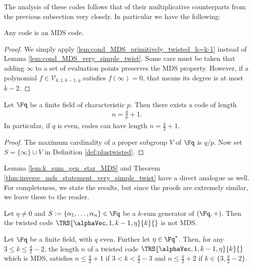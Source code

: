 \documentclass[conference,a4paper]{IEEEtran}
\begin{document}
The analysis of these codes follows that of their multiplicative counterparts from the previous subsection very closely.
In particular we have the following:
\begin{theorem}\label{thm:MDS_property_primitively_twisted_h=k-1}
Any \plustw code is an MDS code.
\end{theorem}
\begin{proof}
We simply apply \cref{lem:cond_MDS_primitively_twisted_h=k-1} instead of Lemma \ref{lem:cond_MDS_very_simple_twist}. Some care must be taken that adding $\infty$ to a set of evaluation points preserves the MDS property. However, if a polynomial $f \in \mathcal{V}_{k,1,k-1,\eta}$ satisfies $f(\infty)=0$, that means its degree is at most $k-2$.
\end{proof}

\begin{corollary}\label{cor:MDS_primitively-twisted_h=k-1}
Let $\Fq$ be a finite field of characteristic $p$. Then there exists a \plustw code of length
\begin{align*}
n = \tfrac{q}{p}+1.
\end{align*}
In particular, if $q$ is even, \plustw codes can have length $n = \frac{q}{2}+1$.
\end{corollary}
\begin{proof}
The maximum cardinality of a proper subgroup $V$ of $\Fq$ is $q/p$. Now set $S=\{\infty\} \cup V$ in Definition \ref{def:plustwisted}. \end{proof}

Lemma \ref{lem:k_sum_gen_star_MDS} and Theorem \ref{thm:inverse_mds_statement_very_simple_twist} have a direct analogue as well. For completeness, we state the results, but since the proofs are extremely similar, we leave these to the reader.
\begin{lemma}
  \label{lem:k_sum_gen_plus_MDS}
  Let $\eta \neq 0$ and $S := \{\alpha_1,\dots,\alpha_n\} \in \Fq$ be a $k$-sum generator of $(\Fq,+)$.
  Then the twisted code $\TRS{\alphaVec,1,k-1,\eta}{k}{}$ is not MDS.
\end{lemma}

\begin{theorem}\label{thm:inverse_mds_statement_very_simple_twist_h=k-1}
Let $\Fq$ be a finite field, with $q$ even. Further let $\eta \in \Fq^*$. Then, for any $3 \leq k \leq \tfrac{q}{2}-2$, the length $n$ of a twisted code $\TRS{\alphaVec,1,k-1,\eta}{k}{}$ which is MDS, satisfies $n \leq \frac{q}{2}+1$ if $3< k < \frac{q}{2}-3$ and $n \leq \frac{q}{2}+2$ if $k \in \{3,\frac{q}{2}-2\}.$
\end{theorem}
\end{document}
